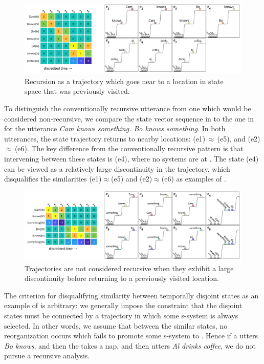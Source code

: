   
\begin{figure}
\includegraphics[width=\textwidth]{figures/Tilsen-img112.png}
\caption{Recursion as a trajectory which goes near to a location in state space that was previously visited.}
\label{fig:5:8}
\end{figure}
 

  To distinguish the conventionally recursive utterance from one which would be considered non-recursive, we compare the state vector sequence in {} to the one in {} for the utterance \textit{Cam knows something. Bo knows something}. In both utterances, the state trajectory returns to nearby locations: (e1)\,${\approx}$\,(e5), and (e2)\,${\approx}$\,(e6). The key difference from the conventionally recursive pattern is that intervening between these states is (e4), where no systems are at . The state (e4) can be viewed as a relatively large discontinuity in the  trajectory, which disqualifies the similarities (e1)${\approx}$(e5) and (e2)${\approx}$(e6) as examples of .

  
\begin{figure}
\includegraphics[width=\textwidth]{figures/Tilsen-img113.png}
\caption{Trajectories are not considered recursive when they exhibit a large discontinuity before returning to a previously visited location.}
\label{fig:5:9}
\end{figure}
 

  The criterion for disqualifying similarity between temporally disjoint states as an example of  is arbitrary: we generally impose the constraint that the disjoint states must be connected by a trajectory in which some s-sys\-tem is always selected. In other words, we assume that between the similar states, no reorganization occurs which fails to promote some s-sys\-tem to . Hence if a  utters \textit{Bo knows}, and then the  takes a nap, and then utters \textit{Al drinks coffee}, we do not pursue a recursive analysis. 

